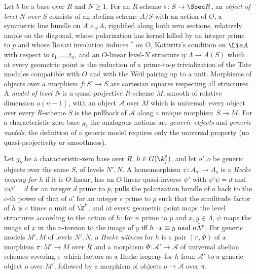 \begin{definition}\label{pf:ks2:def:model}
Let $b$ be a base over $R$ and $N\ge1$. For an $R$-scheme $s\colon S\to\Spec R$, an
\emph{object of level $N$ over $S$} consists of an abelian
scheme $A/S$ with an action of $O$, a symmetric line bundle on $A\times_SA$, rigidified along both
zero sections, relatively ample on the diagonal, whose polarization has kernel killed by an
integer prime to $p$ and whose Rosati involution induces ${}^*$ on $O$, Kottwitz's condition on
$\Lie A$ with respect to $t_1,\dots,t_a$, and an $O$-linear level-$N$ structure
$\eta\colon\Lambda\to A(S)$ which at every geometric point is the reduction of a prime-to-$p$
trivialization of the Tate modules compatible with $O$ and with the Weil pairing up to a unit.
Morphisms of objects over a morphism $f\colon S'\to S$ are cartesian squares respecting all
structures. A \emph{model of level $N$} is a quasi-projective $R$-scheme $M$, smooth of relative
dimension $a(n-1)$, with an object $\mathcal A$ over $M$ which is universal: every object over
every $R$-scheme $S$ is the pullback of $\mathcal A$ along a unique morphism $S\to M$. For a
characteristic-zero base $g_b$ the analogous notions are \emph{generic objects} and \emph{generic models}; the definition of a generic model requires only the
universal property (no quasi-projectivity or smoothness).
\end{definition}

\begin{definition}\label{pf:ks2:def:wit}
Let $g_b$ be a characteristic-zero base over $R$, $h\in\kstwoG$, and let $o',o$ be generic
objects over the same $S$, of levels $N',N$. A homomorphism $\psi\colon A_{o'}\to A_o$ is a
\emph{Hecke isogeny for $h$} if it is $O$-linear, has an
$O$-linear quasi-inverse $\psi'$ with $\psi'\psi=d$ and $\psi\psi'=d$ for an integer $d$ prime to
$p$, pulls the polarization bundle of $o$ back to the $c$-th power of that of $o'$ for an integer
$c$ prime to $p$ such that the similitude factor of $h$ is $c$ times a unit of $\hat\Z^p$, and at
every geometric point maps the level structures according to the action of $h$: for $n$ prime to
$p$ and $x,y\in\Lambda$, $\psi$ maps the image of $x$ in the $n$-torsion to the image of $y$ iff
$h\cdot x\equiv y\bmod n\hat\Lambda^{p}$. For generic models $M',M$ of levels $N',N$, a \emph{Hecke
witness} for $h$ is a pair $(\pi,\Phi)$ of a morphism
$\pi\colon M'\to M$ over $R$ and a morphism $\Phi\colon\mathcal A'\to\mathcal A$ of universal
abelian schemes covering $\pi$ which factors as a Hecke isogeny for $h$ from $\mathcal A'$ to a
generic object $o$ over $M'$, followed by a morphism of objects $o\to\mathcal A$ over $\pi$.
\end{definition}

